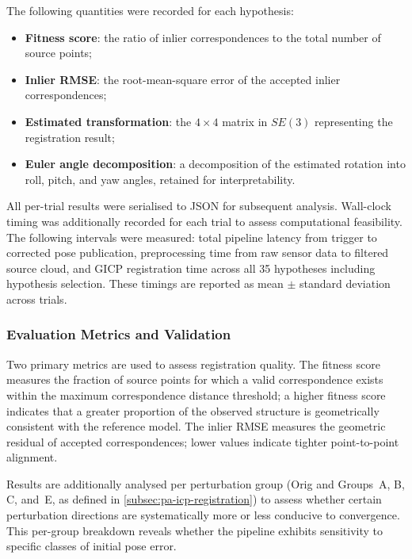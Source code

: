 The following quantities were recorded for each hypothesis:
%
\begin{itemize}
  \item \textbf{Fitness score}: the ratio of inlier correspondences to the total number of source points;
  \item \textbf{Inlier RMSE}: the root-mean-square error of the accepted inlier correspondences;
  \item \textbf{Estimated transformation}: the $4 \times 4$ matrix in $SE(3)$ representing the registration result;
  \item \textbf{Euler angle decomposition}: a decomposition of the estimated rotation into roll, pitch, and yaw angles, retained for interpretability.
\end{itemize}
%
All per-trial results were serialised to JSON for subsequent analysis. Wall-clock timing was additionally recorded for each trial to assess computational feasibility. The following intervals were measured: total pipeline latency from trigger to corrected pose publication, preprocessing time from raw sensor data to filtered source cloud, and GICP registration time across all 35 hypotheses including hypothesis selection. These timings are reported as mean $\pm$ standard deviation across trials.

\subsubsection{Evaluation Metrics and Validation}
\label{subsubsec:pa-eval-metrics}

Two primary metrics are used to assess registration quality. The fitness score measures the fraction of source points for which a valid correspondence exists within the maximum correspondence distance threshold; a higher fitness score indicates that a greater proportion of the observed structure is geometrically consistent with the reference model. The inlier RMSE measures the geometric residual of accepted correspondences; lower values indicate tighter point-to-point alignment.

Results are additionally analysed per perturbation group (Orig and Groups~A, B, C, and~E, as defined in \cref{subsec:pa-icp-registration}) to assess whether certain perturbation directions are systematically more or less conducive to convergence. This per-group breakdown reveals whether the pipeline exhibits sensitivity to specific classes of initial pose error.

